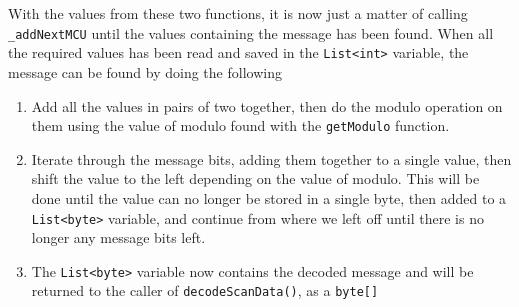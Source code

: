 With the values from these two functions, it is now just a matter of calling \lstinline|_addNextMCU| until the values containing the message has been found.
When all the required values has been read and saved in the \lstinline|List<int>| variable, the message can be found by doing the following
\begin{enumerate}
	\item Add all the values in pairs of two together, then do the modulo operation on them using the value of modulo found with the \lstinline|getModulo| function.
	\item Iterate through the message bits, adding them together to a single value, then shift the value to the left depending on the value of modulo.
	This will be done until the value can no longer be stored in a single byte, then added to a \lstinline|List<byte>| variable, and continue from where we left off until there is no longer any message bits left.
	\item The \lstinline|List<byte>| variable now contains the decoded message and will be returned to the caller of \lstinline|decodeScanData()|, as a \lstinline|byte[]|
\end{enumerate}
